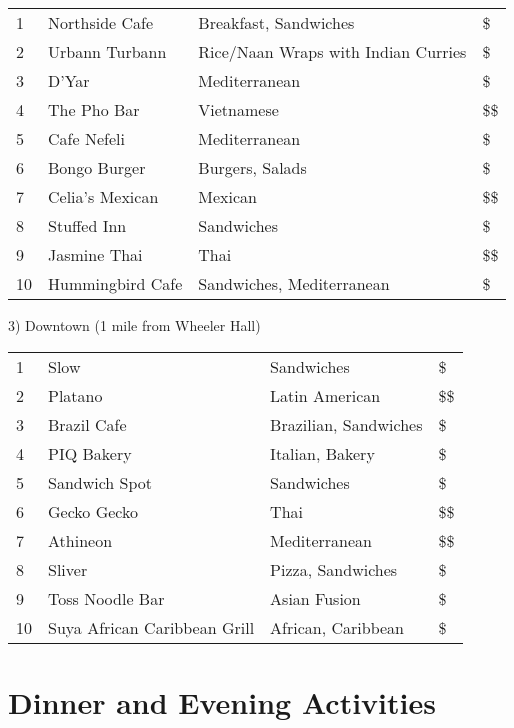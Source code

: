 \begingroup
\small
\begin{multicols}{1}[]
    \begin{tabular}{p{0.3cm} p{4cm} p{5cm} p{0.5cm}}
        1 & Northside Cafe & Breakfast, Sandwiches & \$\\
        2 & Urbann Turbann & Rice/Naan Wraps with Indian Curries & \$\\
        3 & D'Yar & Mediterranean & \$\\
        4 & The Pho Bar & Vietnamese  & \$\$\\
        5 & Cafe Nefeli & Mediterranean & \$\\ 
        6 & Bongo Burger & Burgers, Salads & \$\\
        7 & Celia's Mexican & Mexican & \$\$\\
        8 & Stuffed Inn & Sandwiches & \$\\
        9 & Jasmine Thai & Thai & \$\$\\
        10 & Hummingbird Cafe & Sandwiches, Mediterranean & \$\\
    \end{tabular}
\end{multicols}
\endgroup
\normalsize 

3) Downtown (1 mile from Wheeler Hall)

\begingroup
\small
\begin{multicols}{1}[]
    \begin{tabular}{p{0.3cm} p{4cm} p{5cm} p{0.5cm}}
        1 & Slow & Sandwiches & \$\\
        2 & Platano & Latin American & \$\$\\
        3 & Brazil Cafe & Brazilian, Sandwiches & \$\\
        4 & PIQ Bakery & Italian, Bakery  & \$\\
        5 & Sandwich Spot & Sandwiches & \$\\ 
        6 & Gecko Gecko & Thai & \$\$\\
        7 & Athineon & Mediterranean & \$\$\\
        8 & Sliver & Pizza, Sandwiches & \$\\
        9 & Toss Noodle Bar & Asian Fusion & \$\\
        10 & Suya African Caribbean Grill & African, Caribbean & \$\\
    \end{tabular}
\end{multicols}
\endgroup
\normalsize 

 \section{Dinner and Evening Activities}




\setlength\fboxrule{0pt}
